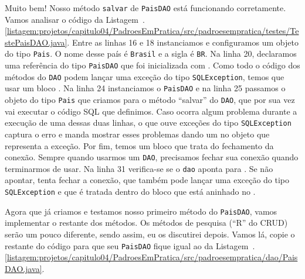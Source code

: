 Muito bem! Nosso método \texttt{salvar} de \texttt{PaisDAO} está funcionando corretamente. Vamos analisar o código da Listagem~\thechapter.\ref{listagem:projetos/capitulo04/PadroesEmPratica/src/padroesempratica/testes/TestePaisDAO.java}. Entre as linhas 16 e 18 instanciamos e configuramos um objeto do tipo \texttt{Pais}. O nome desse país é \texttt{Brasil} e a sigla é \texttt{BR}. Na linha 20, declaramos uma referência do tipo \texttt{PaisDAO} que foi inicializada com . Como todo o código dos métodos do \texttt{DAO} podem lançar uma exceção do tipo \texttt{SQLException}, temos que usar um bloco . Na linha 24 instanciamos o \texttt{PaisDAO} e na linha 25 passamos o objeto do tipo \texttt{Pais} que criamos para o método ``salvar'' do \texttt{DAO}, que por sua vez vai executar o código SQL que definimos. Caso ocorra algum problema durante a execução de uma dessas duas linhas, o  que ouve exceções do tipo \texttt{SQLException} captura o erro e manda mostrar esses problemas dando um  no objeto que representa a exceção. Por fim, temos um bloco  que trata do fechamento da conexão. Sempre quando usarmos um \texttt{DAO}, precisamos fechar sua conexão quando terminarmos de usar. Na linha 31 verifica-se se o \texttt{dao} aponta para . Se não apontar, tenta fechar a conexão, que também pode lançar uma exceção do tipo \texttt{SQLException} e que é tratada dentro do bloco  que está aninhado no .

Agora que já criamos e testamos nosso primeiro método do \texttt{PaisDAO}, vamos implementar o restante dos métodos. Os métodos de pesquisa (``R'' do CRUD) serão um pouco diferente, sendo assim, eu os discutirei depois. Vamos lá, copie o restante do código para que seu \texttt{PaisDAO} fique igual ao da Listagem~\thechapter.\ref{listagem:projetos/capitulo04/PadroesEmPratica/src/padroesempratica/dao/PaisDAO.java}.


